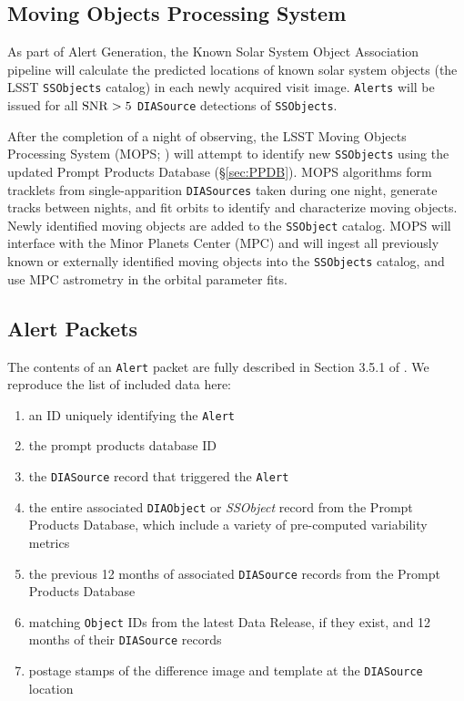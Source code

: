 \subsection{Moving Objects Processing System}\label{sec:AGP_MOPS}


As part of Alert Generation, the Known Solar System Object Association pipeline will calculate the predicted locations of known solar system objects (the LSST {\tt SSObjects} catalog) in each newly acquired visit image. 
{\tt Alerts} will be issued for all ${\rm SNR} > 5$ \texttt{DIASource} detections of \texttt{SSObjects}.

After the completion of a night of observing,
the LSST Moving Objects Processing System (MOPS; ) will attempt to identify new \texttt{SSObjects} using the updated Prompt Products Database (\S \ref{sec:PPDB}).
MOPS algorithms form tracklets from single-apparition \texttt{DIASources} taken during one night, generate tracks between nights, and fit orbits to identify and characterize moving objects.
Newly identified moving objects are added to the {\tt SSObject} catalog.
MOPS will interface with the Minor Planets Center (MPC) and will ingest all previously known or externally identified moving objects into the {\tt SSObjects} catalog, and use MPC astrometry in the orbital parameter fits.


\subsection{Alert Packets}\label{sec:packets}

The contents of an {\tt Alert} packet are fully described in Section 3.5.1 of . We reproduce the list of included data here:
\renewcommand{\labelenumi}{\Roman{enumi}.}
\begin{enumerate}
\item an ID uniquely identifying the {\tt Alert}
\item the prompt products database ID
\item the {\tt DIASource} record that triggered the {\tt Alert}
\item the entire associated {\tt DIAObject} or {\it SSObject} record from the Prompt Products Database, which include a variety of pre-computed variability metrics
\item the previous 12 months of associated {\tt DIASource} records from the Prompt Products Database
\item matching {\tt Object} IDs from the latest Data Release, if they exist, and 12 months of their {\tt DIASource} records
\item postage stamps of the difference image and template at the {\tt DIASource} location
\end{enumerate}

